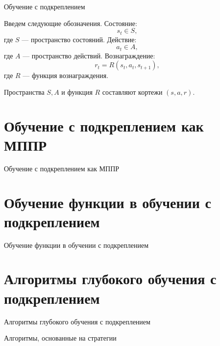 \documentclass[10pt,aspectratio=169]{beamer}
\begin{document}
\begin{frame}{Обучение с подкреплением}
	
	Введем следующие обозначения.
	Состояние:
	\begin{equation}
		s_t\in S,
	\end{equation}
	где $S$ --- пространство состояний.
	Действие:
	\begin{equation}
		a_t\in A,
	\end{equation}
	где $A$ --- пространство действий.
	Вознаграждение:
	\begin{equation}
		r_t=R\left(s_t,a_t,s_{t+1}\right),
	\end{equation}
	где $R$ --- функция вознаграждения.
	
	Пространства $S, A$ и функция $R$ составляют кортежи $\left(s, a, r\right)$.
	
\end{frame}




\section{Обучение с подкреплением как МППР}

\begin{frame}{Обучение с подкреплением как МППР}
	
\end{frame}

\section{Обучение функции в обучении с подкреплением}

\begin{frame}{Обучение функции в обучении с подкреплением}
	
\end{frame}

\section{Алгоритмы глубокого обучения с подкреплением}

\begin{frame}{Алгоритмы глубокого обучения с подкреплением}
	
\end{frame}

\begin{frame}{Алгоритмы, основанные на стратегии}
	
\end{frame}
\end{document}
